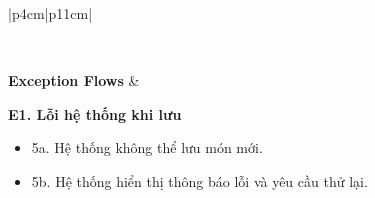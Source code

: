 \begin{longtable}{|p{4cm}|p{11cm}|}
\begin{minipage}[t]{\linewidth}
\end{minipage}
\\ \hline

\textbf{Exception Flows} &
\begin{minipage}[t]{\linewidth}
\vspace{0.3mm}

\textbf{E1. Lỗi hệ thống khi lưu}
\begin{itemize}
\item 5a. Hệ thống không thể lưu món mới.
\item 5b. Hệ thống hiển thị thông báo lỗi và yêu cầu thử lại.
\end{itemize}

\end{minipage}
\\ \hline

\end{longtable}
